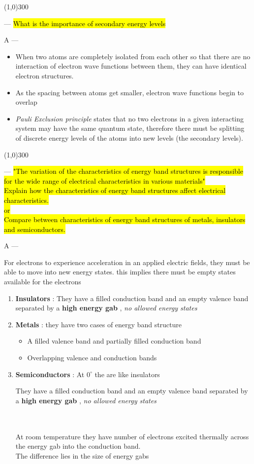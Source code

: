 \documentclass[12pt,a4paper]{article}
\newcounter{question}
\newcommand\Que[1]{
   \line(1,0){300}
   \leavevmode\par
   \stepcounter{question}
   \noindent
   \fbox{\thequestion. Q} --- \hl{#1}\par}
\newcommand\Ans[2][]{%
    \leavevmode\par\noindent
   {\leftskip16pt
    A --- \textbf{#1}#2\par}}
\begin{document}
\begin{large}
\Que{What is the importance of secondary energy levels}
\Ans{
\begin{itemize}
\item When two atoms are completely isolated from each other so that there are no interaction of electron wave functions between them, they can have identical electron structures.

\item As the spacing between atoms get smaller, electron wave functions begin to overlap

\item \textit{Pauli Exclusion principle}  states that no two electrons in a given interacting system may have the same quantum state, therefore there must be splitting of discrete energy levels of the atoms into new levels (the secondary levels).
\end{itemize}
}

\Que{
"The variation of the characteristics of energy band structures is responsible for the wide range of electrical characteristics in various materials"\\
Explain how the characteristics of energy band structures affect electrical characteristics.\\or\\Compare between characteristics of energy band structures of metals, insulators and semiconductors.}
\Ans{

For electrons to experience acceleration in an applied electric fields, they must be able to move into new energy states. this implies there must be empty states available for the electrons

\begin{enumerate}
\item \textbf{Insulators} : They have a filled conduction band and an empty valence band separated by a \textbf{high energy gab} , \textit{no allowed energy states}

\item \textbf{Metals} : they have two cases of energy band structure 
	\begin{itemize}
	\item A filled valence band and partially filled conduction band
	\item Overlapping valence and conduction bands 
	\end{itemize}
	
\item \textbf{Semiconductors} : At $0^{\circ}$ 	the are like insulators \begin{footnotesize}
They have a filled conduction band and an empty valence band separated by a \textbf{high energy gab} , \textit{no allowed energy states}\end{footnotesize} \\
\\
At room temperature they have number of electrons excited thermally across the energy gab into the conduction band.\\The difference lies in the size of energy gabs 
	


\end{enumerate}}
\end{large}
\end{document}
